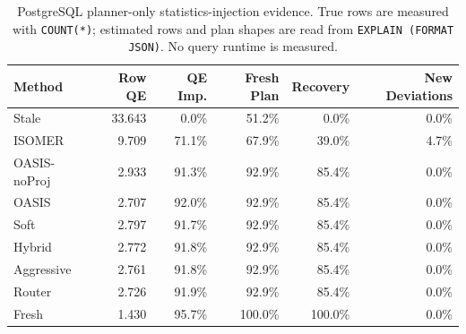 \begin{table}[t]
  \centering
  \small
  \caption{PostgreSQL planner-only statistics-injection evidence. True rows are measured with \texttt{COUNT(*)}; estimated rows and plan shapes are read from \texttt{EXPLAIN (FORMAT JSON)}. No query runtime is measured.}
  \label{tab:postgres_planner_stats_injection}
  \setlength{\tabcolsep}{4pt}
  \begin{tabular}{lrrrrr}
    \toprule
    Method & Row QE & QE Imp. & Fresh Plan & Recovery & New Deviations \\
    \midrule
    Stale & 33.643 & 0.0\% & 51.2\% & 0.0\% & 0.0\% \\
    ISOMER & 9.709 & 71.1\% & 67.9\% & 39.0\% & 4.7\% \\
    OASIS-noProj & 2.933 & 91.3\% & 92.9\% & 85.4\% & 0.0\% \\
    OASIS & 2.707 & 92.0\% & 92.9\% & 85.4\% & 0.0\% \\
    Soft & 2.797 & 91.7\% & 92.9\% & 85.4\% & 0.0\% \\
    Hybrid & 2.772 & 91.8\% & 92.9\% & 85.4\% & 0.0\% \\
    Aggressive & 2.761 & 91.8\% & 92.9\% & 85.4\% & 0.0\% \\
    Router & 2.726 & 91.9\% & 92.9\% & 85.4\% & 0.0\% \\
    Fresh & 1.430 & 95.7\% & 100.0\% & 100.0\% & 0.0\% \\
    \bottomrule
  \end{tabular}
\end{table}
